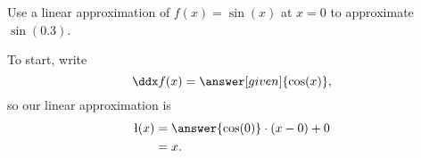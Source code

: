 \begin{example}
  Use a linear approximation of $f(x) =\sin(x)$
  at $x=0$ to approximate $\sin(0.3)$.
  
  \begin{explanation}
    To start, write
    \[
      \ddx f(x) = \answer[given]{\cos(x)},
    \]
    so our linear approximation is
    \begin{align*}
    \l(x) &= \answer{\cos(0)}\cdot(x-0) + 0\\
          &= x.
    \end{align*}
  \end{explanation}
\end{example}
